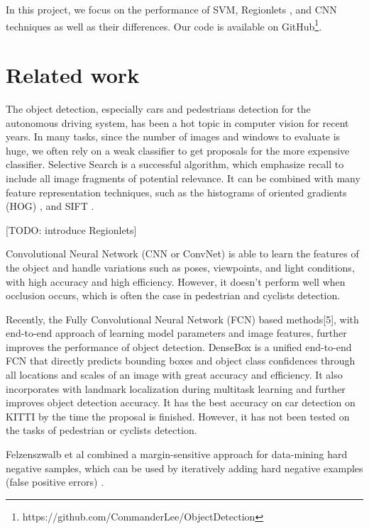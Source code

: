 \documentclass{article} %
\begin{document}
In this project, we focus on the performance of SVM, Regionlets \cite{Wang2013}, and CNN techniques as well as their differences. Our code is available on GitHub\footnote{https://github.com/CommanderLee/ObjectDetection}.

\section{Related work}

The object detection, especially cars and pedestrians detection for the autonomous driving system, has been a hot topic in computer vision for recent years. In many tasks, since the number of images and windows to evaluate is huge, we often rely on a weak classifier to get proposals for the more expensive classifier. Selective Search \cite{van2011segmentation} is a successful algorithm, which emphasize recall to include all image fragments of potential relevance. It can be combined with many feature representation techniques, such as the histograms of oriented gradients (HOG) \cite{dalal2005histograms}, and SIFT \cite{lowe2004distinctive}. 

[TODO: introduce Regionlets]

Convolutional Neural Network (CNN or ConvNet) \cite{Krizhevsky2012} is able to learn the features of the object and handle variations such as poses, viewpoints, and light conditions, with high accuracy and high efficiency. However, it doesn't perform well when occlusion occurs, which is often the case in pedestrian and cyclists detection. 

Recently, the Fully Convolutional Neural Network (FCN) based methods[5], with end-to-end approach of learning model parameters and image features, further improves the performance of object detection. DenseBox \cite{Huang2015} is a unified end-to-end FCN that
directly predicts bounding boxes and object class confidences through all locations
and scales of an image with great accuracy and efficiency. It also incorporates with landmark localization during multitask learning and further improves
object detection accuracy. It has the best accuracy on car detection on KITTI by the time the proposal is finished. However, it has not been tested on the tasks of pedestrian or cyclists detection.

Felzenszwalb et al \cite{felzenszwalb2010object} combined a margin-sensitive approach for data-mining hard negative samples, which can be used by iteratively adding hard negative examples (false positive errors) \cite{van2011segmentation}.
\end{document}
